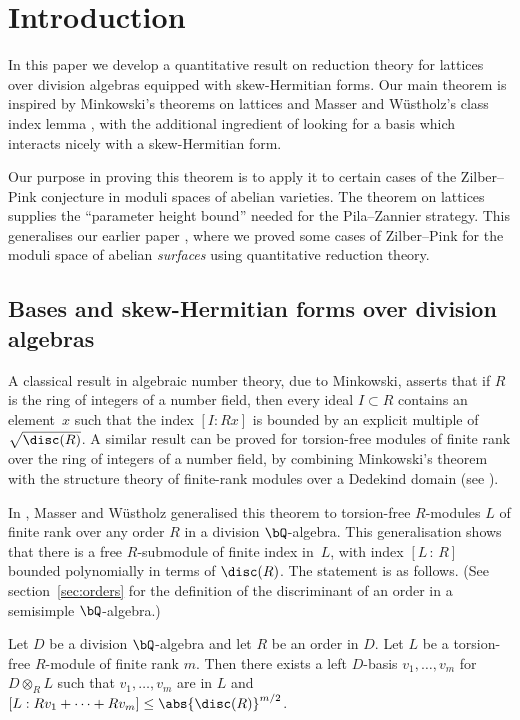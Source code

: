 
\section{Introduction}

In this paper we develop a quantitative result on reduction theory for lattices over division algebras equipped with skew-Hermitian forms. Our main theorem is inspired by Minkowski's theorems on lattices and Masser and Wüstholz's class index lemma \cite{MW95}, with the additional ingredient of looking for a basis which interacts nicely with a skew-Hermitian form.

Our purpose in proving this theorem is to apply it to certain cases of the Zilber--Pink conjecture in moduli spaces of abelian varieties. The theorem on lattices supplies the ``parameter height bound'' needed for the Pila--Zannier strategy.
This generalises our earlier paper \cite{QRTUI}, where we proved some cases of Zilber--Pink for the moduli space of abelian \textit{surfaces} using quantitative reduction theory.

\subsection{Bases and skew-Hermitian forms over division algebras}

A classical result in algebraic number theory, due to Minkowski, asserts that if $R$ is the ring of integers of a number field, then every ideal $I \subset R$ contains an element~$x$ such that the index $[I:Rx]$ is bounded by an explicit multiple of $\sqrt{\disc(R)}$.
A similar result can be proved for torsion-free modules of finite rank over the ring of integers of a number field, by combining Minkowski's theorem with the structure theory of finite-rank modules over a Dedekind domain (see \cite[\S 22, Ex.\,6]{CR62}).

In \cite{MW95}, Masser and Wüstholz generalised this theorem to torsion-free $R$\nobreakdash-mod\-ules $L$ of finite rank over any order $R$ in a division $\bQ$-algebra.
This generalisation shows that there is a free $R$-submodule of finite index in~$L$, with index $[L\,{:}\,R]$ bounded polynomially in terms of $\disc(R)$.
The statement is as follows. (See section~\ref{sec:orders} for the definition of the discriminant of an order in a semisimple $\bQ$-algebra.)

\begin{theorem}\label{minkowski-general-index}
Let $D$ be a division $\bQ$-algebra and let $R$ be an order in $D$.
Let $L$ be a torsion-free $R$-module of finite rank $m$.
Then there exists a left $D$-basis $v_1, \dotsc, v_m$ for $D \otimes_R L$ such that $v_1, \dotsc, v_m$ are in $L$ and $[L:Rv_1 + \dotsb + Rv_m] \leq \abs{\disc(R)}^{m/2}$.
\end{theorem}

